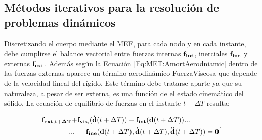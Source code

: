 \subsection{Métodos iterativos para la resolución de problemas dinámicos }\label{Sec:MET:EqEquilibrio}

%
%
%

Discretizando el cuerpo mediante el MEF, para cada nodo y en cada instante, debe cumplirse el balance vectorial entre fuerzas internas $\bf{f}_{int}$, inerciales $\bf{f}_{ine}$ y externas $\bf{f}_{ext}$. Además según la Ecuación \eqref{Eq:MET:AmortAerodniamic} dentro de las fuerzas externas aparece un término aerodinámico \gls{FuerzaViscosa} que depende de la velocidad lineal del rígido. Este término debe tratarse aparte ya que su naturaleza, a pesar de ser externa, es una función de el estado cinemático del sólido. La ecuación de equilibrio de fuerzas en el instante $t+\Delta T$ resulta:

\begin{equation}\label{Eq:MET:EquilibrioExacto}
	\begin{split}
		\bf{f}_{ext,t+\Delta T}+&\bf{f}_{vis,}(\dot{\bf{d}}\text{$(t+\Delta T)$})-\bf{f}_{int}(\bf{d}\text{$(t+\Delta T)$})...\\
		...~&-\bf{f}_{ine}(\bf{d} \text{$(t+\Delta T)$},\dot{\bf{d}}\text{$(t+\Delta T)$},\ddot{\bf{d}}\text{$(t+\Delta T)$})=0
	\end{split}.
\end{equation}

